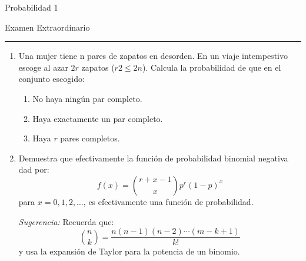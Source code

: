 \documentclass{report}
\begin{document}
\begin{center}
    \textsf{\Large Probabilidad 1}
    \par\medskip
    \textsf{\large Examen Extraordinario}
    \end{center}
    \hrule
    \par\bigskip

\begin{enumerate}
    \item Una mujer tiene n pares de zapatos en desorden. En un viaje intempestivo escoge al azar $2r$ zapatos ($r2\leq 2n$). Calcula la probabilidad de que en el conjunto escogido:
    \begin{enumerate}
        \item No haya ningún par completo.
        \item Haya exactamente un par completo.
        \item Haya $r$ pares completos.
    \end{enumerate}
    \item Demuestra que efectivamente la función de probabilidad binomial negativa dad por:
    $$
    f(x)= \binom{r+x-1}{x}p^r(1-p)^x
    $$
    para $x= 0,1,2,\ldots$, es efectivamente una función de probabilidad.
    \par\noindent
    \emph{Sugerencia:} Recuerda que:
    $$
    \binom{n}{k}= \frac{n(n-1)(n-2)\cdots (m-k+1)}{k!}
    $$
    y usa la expansión de Taylor para la potencia de un binomio.

\end{enumerate}
\end{document}
